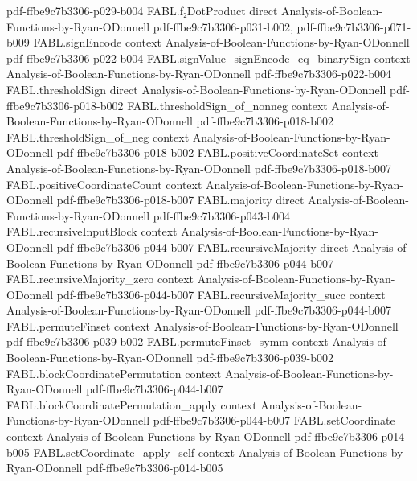 \begin{theorem}
  {pdf-ffbe9c7b3306-p029-b004}
\proofstep
  {FABL.f₂DotProduct}
  {direct}
  {Analysis-of-Boolean-Functions-by-Ryan-ODonnell}
  {pdf-ffbe9c7b3306-p031-b002,
    pdf-ffbe9c7b3306-p071-b009}
\proofstep
  {FABL.signEncode}
  {context}
  {Analysis-of-Boolean-Functions-by-Ryan-ODonnell}
  {pdf-ffbe9c7b3306-p022-b004}
\proofstep
  {FABL.signValue_signEncode_eq_binarySign}
  {context}
  {Analysis-of-Boolean-Functions-by-Ryan-ODonnell}
  {pdf-ffbe9c7b3306-p022-b004}
\proofstep
  {FABL.thresholdSign}
  {direct}
  {Analysis-of-Boolean-Functions-by-Ryan-ODonnell}
  {pdf-ffbe9c7b3306-p018-b002}
\proofstep
  {FABL.thresholdSign_of_nonneg}
  {context}
  {Analysis-of-Boolean-Functions-by-Ryan-ODonnell}
  {pdf-ffbe9c7b3306-p018-b002}
\proofstep
  {FABL.thresholdSign_of_neg}
  {context}
  {Analysis-of-Boolean-Functions-by-Ryan-ODonnell}
  {pdf-ffbe9c7b3306-p018-b002}
\proofstep
  {FABL.positiveCoordinateSet}
  {context}
  {Analysis-of-Boolean-Functions-by-Ryan-ODonnell}
  {pdf-ffbe9c7b3306-p018-b007}
\proofstep
  {FABL.positiveCoordinateCount}
  {context}
  {Analysis-of-Boolean-Functions-by-Ryan-ODonnell}
  {pdf-ffbe9c7b3306-p018-b007}
\proofstep
  {FABL.majority}
  {direct}
  {Analysis-of-Boolean-Functions-by-Ryan-ODonnell}
  {pdf-ffbe9c7b3306-p043-b004}
\proofstep
  {FABL.recursiveInputBlock}
  {context}
  {Analysis-of-Boolean-Functions-by-Ryan-ODonnell}
  {pdf-ffbe9c7b3306-p044-b007}
\proofstep
  {FABL.recursiveMajority}
  {direct}
  {Analysis-of-Boolean-Functions-by-Ryan-ODonnell}
  {pdf-ffbe9c7b3306-p044-b007}
\proofstep
  {FABL.recursiveMajority_zero}
  {context}
  {Analysis-of-Boolean-Functions-by-Ryan-ODonnell}
  {pdf-ffbe9c7b3306-p044-b007}
\proofstep
  {FABL.recursiveMajority_succ}
  {context}
  {Analysis-of-Boolean-Functions-by-Ryan-ODonnell}
  {pdf-ffbe9c7b3306-p044-b007}
\proofstep
  {FABL.permuteFinset}
  {context}
  {Analysis-of-Boolean-Functions-by-Ryan-ODonnell}
  {pdf-ffbe9c7b3306-p039-b002}
\proofstep
  {FABL.permuteFinset_symm}
  {context}
  {Analysis-of-Boolean-Functions-by-Ryan-ODonnell}
  {pdf-ffbe9c7b3306-p039-b002}
\proofstep
  {FABL.blockCoordinatePermutation}
  {context}
  {Analysis-of-Boolean-Functions-by-Ryan-ODonnell}
  {pdf-ffbe9c7b3306-p044-b007}
\proofstep
  {FABL.blockCoordinatePermutation_apply}
  {context}
  {Analysis-of-Boolean-Functions-by-Ryan-ODonnell}
  {pdf-ffbe9c7b3306-p044-b007}
\proofstep
  {FABL.setCoordinate}
  {context}
  {Analysis-of-Boolean-Functions-by-Ryan-ODonnell}
  {pdf-ffbe9c7b3306-p014-b005}
\proofstep
  {FABL.setCoordinate_apply_self}
  {context}
  {Analysis-of-Boolean-Functions-by-Ryan-ODonnell}
  {pdf-ffbe9c7b3306-p014-b005}

\end{theorem}
